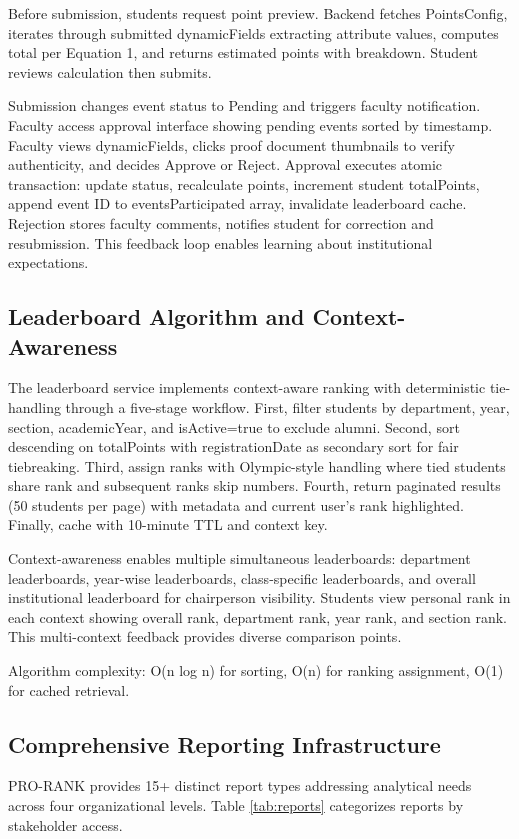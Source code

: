\documentclass[conference]{IEEEtran}
\begin{document}
Before submission, students request point preview. Backend fetches PointsConfig, iterates through submitted dynamicFields extracting attribute values, computes total per Equation 1, and returns estimated points with breakdown. Student reviews calculation then submits.

Submission changes event status to Pending and triggers faculty notification. Faculty access approval interface showing pending events sorted by timestamp. Faculty views dynamicFields, clicks proof document thumbnails to verify authenticity, and decides Approve or Reject. Approval executes atomic transaction: update status, recalculate points, increment student totalPoints, append event ID to eventsParticipated array, invalidate leaderboard cache. Rejection stores faculty comments, notifies student for correction and resubmission. This feedback loop enables learning about institutional expectations.

\subsection{Leaderboard Algorithm and Context-Awareness}
The leaderboard service implements context-aware ranking with deterministic tie-handling through a five-stage workflow. First, filter students by department, year, section, academicYear, and isActive=true to exclude alumni. Second, sort descending on totalPoints with registrationDate as secondary sort for fair tiebreaking. Third, assign ranks with Olympic-style handling where tied students share rank and subsequent ranks skip numbers. Fourth, return paginated results (50 students per page) with metadata and current user's rank highlighted. Finally, cache with 10-minute TTL and context key.

Context-awareness enables multiple simultaneous leaderboards: department leaderboards, year-wise leaderboards, class-specific leaderboards, and overall institutional leaderboard for chairperson visibility. Students view personal rank in each context showing overall rank, department rank, year rank, and section rank. This multi-context feedback provides diverse comparison points.

Algorithm complexity: O(n log n) for sorting, O(n) for ranking assignment, O(1) for cached retrieval.

\subsection{Comprehensive Reporting Infrastructure}
PRO-RANK provides 15+ distinct report types addressing analytical needs across four organizational levels. Table \ref{tab:reports} categorizes reports by stakeholder access.
\end{document}
